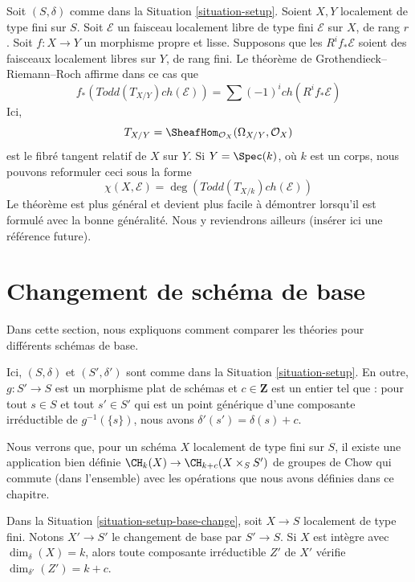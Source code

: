 \noindent
Soit $(S, \delta)$ comme dans la
Situation \ref{situation-setup}.
Soient $X, Y$ localement de type fini sur $S$.
Soit $\mathcal{E}$ un faisceau localement libre de type fini
${\mathcal E}$ sur $X$, de rang $r$.
Soit $f : X \to Y$ un morphisme propre et lisse.
Supposons que les $R^if_*\mathcal{E}$ soient des faisceaux localement libres
sur $Y$, de rang fini.
Le théorème de Grothendieck--Riemann--Roch affirme dans ce
cas que
$$
f_*(Todd(T_{X/Y}) ch(\mathcal{E}))
=
\sum (-1)^i ch(R^if_*\mathcal{E})
$$
Ici,
$$
T_{X/Y} = \SheafHom_{\mathcal{O}_X}(\Omega_{X/Y}, \mathcal{O}_X)
$$
est le fibré tangent relatif de $X$ sur $Y$. Si $Y = \Spec(k)$,
où $k$ est un corps, nous pouvons reformuler ceci sous la forme
$$
\chi(X, \mathcal{E}) = \deg(Todd(T_{X/k}) ch(\mathcal{E}))
$$
Le théorème est plus général et devient plus facile à démontrer
lorsqu'il est formulé avec la bonne généralité. Nous y reviendrons
ailleurs (insérer ici une référence future).







\section{Changement de schéma de base}
\label{section-change-base}

\noindent
Dans cette section, nous expliquons comment comparer les théories pour différents
schémas de base.

\begin{situation}
\label{situation-setup-base-change}
Ici, $(S, \delta)$ et $(S', \delta')$ sont comme dans la
Situation \ref{situation-setup}. En outre, $g : S' \to S$
est un morphisme plat de schémas et $c \in \mathbf{Z}$
est un entier tel que : pour tout $s \in S$ et tout $s' \in S'$
qui est un point générique d'une composante irréductible de $g^{-1}(\{s\})$, nous avons
$\delta'(s') = \delta(s) + c$.
\end{situation}

\noindent
Nous verrons que, pour un schéma $X$ localement de type fini sur $S$,
il existe une application bien définie $\CH_k(X) \to \CH_{k + c}(X \times_S S')$
de groupes de Chow qui commute (dans l'ensemble) avec les opérations
que nous avons définies dans ce chapitre.

\begin{lemma}
\label{lemma-dimension-base-change}
Dans la Situation \ref{situation-setup-base-change}, soit $X \to S$ localement
de type fini. Notons $X' \to S'$ le changement de base par $S' \to S$.
Si $X$ est intègre avec $\dim_\delta(X) = k$, alors
toute composante irréductible $Z'$ de $X'$ vérifie $\dim_{\delta'}(Z') = k + c$.
\end{lemma}

